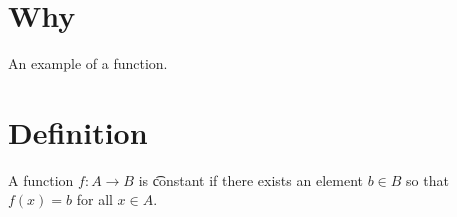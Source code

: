 

\section*{Why}

An example of a function.

\section*{Definition}

A function $f: A \to B$ is \t{constant} if there exists an element $b \in B$ so that $f(x) = b$ for all $x \in A$.

\blankpage
